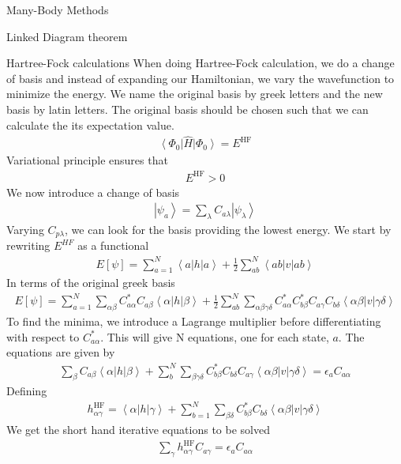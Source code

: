 \documentclass[twoside,english]{uiofysmaster}
\begin{document}
\begin{chapter}{Many-Body Methods}
\begin{section}{Linked Diagram theorem}
	\end{section}

	\begin{section}{Hartree-Fock calculations}
 		When doing Hartree-Fock calculation, we do a change of basis and instead of expanding our Hamiltonian, we vary the wavefunction to minimize the energy. We name the original basis by greek letters and the new basis by latin letters. The original basis should be chosen such that we can calculate the its expectation value. 
 		\begin{align}
 			\left< \Phi_0 \right| \hat H \left| \Phi_0 \right> = E^{\text{HF}}
 		\end{align}
 		Variational principle ensures that 
 		\begin{align}
 			E^{\text{HF}} > 0 
 		\end{align}
 		We now introduce a change of basis 
 		\begin{align}
 			\left| \psi_a \right> = \sum_{\lambda} C_{a\lambda} \left| \psi_{\lambda} \right>
 		\end{align}
 		Varying $C_{p\lambda}$, we can look for the basis providing the lowest energy. We start by rewriting $E^{HF}$ as a functional
 		\begin{align}
 			E\left[ \psi \right] = \sum_{a=1}^N \left< a \right| h \left| a \right> + \frac{1}{2} \sum_{ab}^N \left< ab \right| v \left| ab \right>
  		\end{align}
  		In terms of the original greek basis
  		\begin{align}
  			E\left[ \psi \right] = \sum_{a=1}^N \sum_{\alpha \beta} C_{a \alpha}^* C_{a \beta} \left< \alpha \right| h \left| \beta \right> + \frac{1}{2} \sum_{ab}^N \sum_{\alpha \beta \gamma \delta} C_{a \alpha}^* C_{b \beta}^* C_{a \gamma} C_{b \delta} \left< \alpha \beta \right| v \left| \gamma \delta \right>
  		\end{align}
  		To find the minima, we introduce a Lagrange multiplier before differentiating with respect to $C_{a  \alpha}^*$. This will give N equations, one for each state, $a$. The equations are given by
  		\begin{align}
  			\sum_{\beta} C_{a \beta} \left< \alpha \right| h \left| \beta \right> + \sum_b^N \sum_{\beta \gamma \delta} C_{b \beta}^* C_{b \delta} C_{a \gamma} \left< \alpha \beta \right| v \left| \gamma \delta \right> = \epsilon_a C_{a \alpha}
  		\end{align}
  		Defining
  		\begin{align}
  			h_{\alpha \gamma}^{\text{HF}} = \left< \alpha \right| h \left| \gamma \right> + \sum_{b=1}^N \sum_{\beta \delta} C_{b \beta}^* C_{b \delta} \left< \alpha \beta \right| v \left| \gamma \delta \right> 
  		\end{align}
  		We get the short hand iterative equations to be solved 
  		\begin{align}
  			\sum_{\gamma} h_{\alpha \gamma}^{\text{HF}} C_{a \gamma} = \epsilon_{a} C_{a \alpha}
  		\end{align}
 	\end{section}

\end{chapter}
\end{document}
